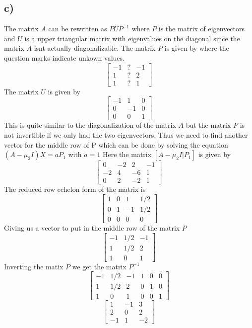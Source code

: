 \documentclass{article}
\begin{document}
\subsection*{c)}
The matrix $A$ can be rewritten as $PUP^{-1}$ where $P$ is the matrix of eigenvectors and $U$ is a upper triangular matrix with eigenvalues on the diagonal since the matrix $A$ isnt actually diagonalizable. The matrix $P$ is given by where the question marks indicate unkown values. 
$$\begin{bmatrix}
    -1 & ? & -1\\
    1 & ? & 2\\
    1 & ? & 1
\end{bmatrix} $$
The matrix $U$ is given by
$$\begin{bmatrix}
    -1 & 1 & 0\\
    0 & -1 & 0\\
    0 & 0 & 1
\end{bmatrix} $$
This is quite similar to the diagonalization of the matrix $A$ but the matrix $P$ is not invertible if we only had the two eigenvectors. Thus we need to find another vector for the middle row of P which can be done by solving the equation $(A - \mu_2 I)X = aP_1$ with $a = 1$ Here the matrix $[A - \mu_2 I | P_1]$ is given by
$$\begin{bmatrix}
    0 & -2 & 2 & -1\\
    -2 & 4 & -6 & 1\\
    0 & 2 & -2 & 1
\end{bmatrix} $$
The reduced row echelon form of the matrix is
$$\begin{bmatrix}
    1 & 0 & 1 & 1/2\\
    0 & 1 & -1 & 1/2\\
    0 & 0 & 0 & 0
\end{bmatrix} $$
Giving us a vector to put in the middle row of the matrix $P$ 
$$\begin{bmatrix}
    -1 & 1/2 & -1\\
    1 & 1/2 & 2\\
    1 & 0 & 1
\end{bmatrix} $$
Inverting the matix $P$ we get the matrix $P^{-1}$
$$\begin{bmatrix}
    -1 & 1/2 & -1 & 1 & 0 & 0\\
    1 & 1/2 & 2 & 0 & 1 & 0 \\
    1 & 0 & 1 & 0 & 0 & 1
\end{bmatrix} $$
$$\begin{bmatrix}
    1 & -1 & 3\\
    2 & 0 & 2\\
    -1 & 1 & -2
\end{bmatrix} $$
\end{document}
